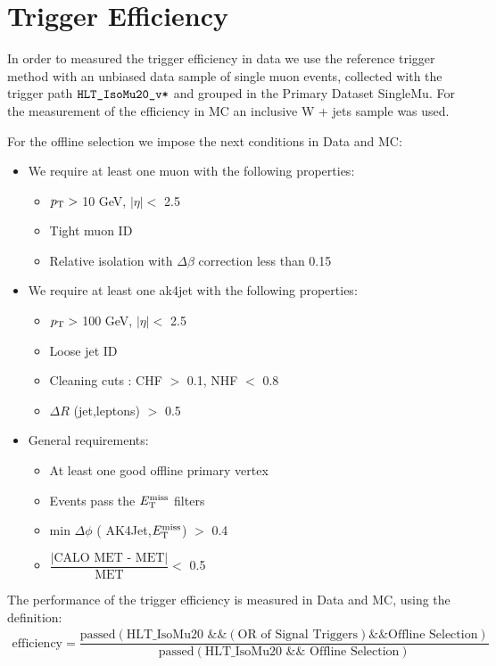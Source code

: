 \section{Trigger Efficiency}

In order to measured the trigger efficiency in data we use the reference trigger method with an unbiased data sample of single muon events, collected with the trigger path $\verb|HLT_IsoMu20_v*|$ and  grouped in the Primary Dataset SingleMu. 
For the measurement of the efficiency in MC an inclusive W + jets sample was used.

For the offline selection we impose the next conditions in Data and MC:
\begin{itemize}
\item
We require at least one muon with the following properties:
\begin{itemize}
\item 
$p_{\mathrm{T}} >$  10 GeV, $\left| \eta \right| <$ 2.5
\item 
Tight muon ID
\item
Relative isolation with $\Delta \beta$ correction less than 0.15
\end{itemize}
\item
We require at least one ak4jet with the following properties:
\begin{itemize}
\item 
$p_{\mathrm{T}} >$  100 GeV, $\left| \eta \right| <$ 2.5
\item
Loose jet ID
\item
Cleaning cuts : CHF $>$ 0.1, NHF $<$ 0.8
\item
$\Delta R$ (jet,leptons) $>$ 0.5
\end{itemize}
\item
General requirements:
\begin{itemize}
\item 
At least one good offline primary vertex
\item
Events pass the $E_{\mathrm{T}}^{\text{miss}}$ filters
\item
min $\Delta \phi$ ( AK4Jet,$E_{\mathrm{T}}^{\text{miss}}$) $>$ 0.4
\item
$\dfrac{\left|\text{CALO MET - MET} \right|}{\text{MET}} <$ 0.5 
\end{itemize}
\end{itemize}



The performance of the trigger efficiency is measured in Data and MC, using the definition:
\begin{eqnarray}\label{eq1}
\text{efficiency} = \dfrac{ \text{passed} ( \text{HLT$\_$IsoMu20  \&\& } (\text{OR of Signal Triggers})   \text{\&\& Offline Selection} )}{\text{passed} (  \text{HLT$\_$IsoMu20  \&\& }  \text{ Offline Selection})}
\end{eqnarray}

